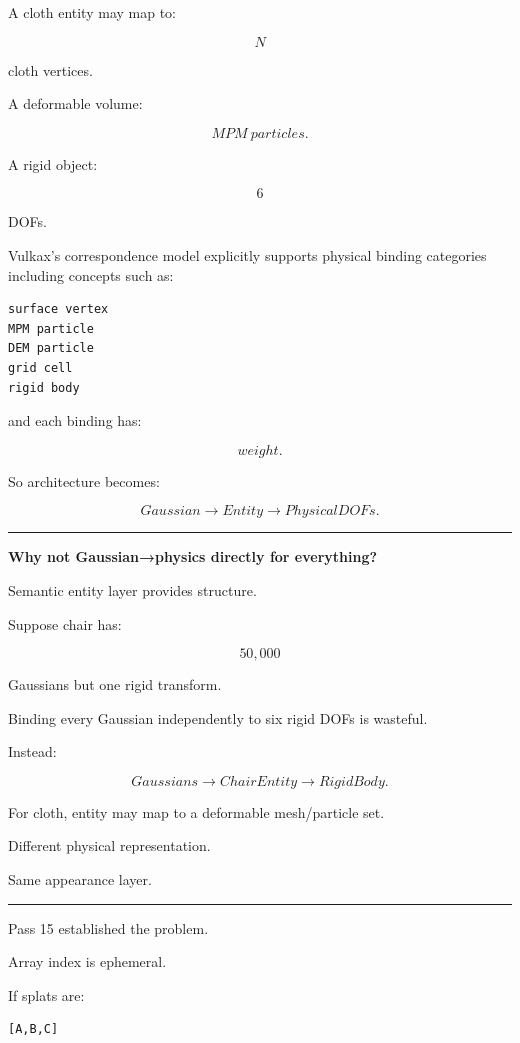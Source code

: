 A cloth entity may map to:

\[
N
\]

cloth vertices.

A deformable volume:

\[
MPM\ particles.
\]

A rigid object:

\[
6
\]

DOFs.

Vulkax's correspondence model explicitly supports physical binding categories including concepts such as:

\protect{}\label{ijumvh}%
\begin{verbatim}
surface vertex
MPM particle
DEM particle
grid cell
rigid body
\end{verbatim}

and each binding has:

\[
weight.
\]

So architecture becomes:

\[
Gaussian
\rightarrow
Entity
\rightarrow
PhysicalDOFs.
\]

\begin{center}\rule{0.5\linewidth}{0.5pt}\end{center}

\textbf{Why not Gaussian→physics directly for everything?}

Semantic entity layer provides structure.

Suppose chair has:

\[
50,000
\]

Gaussians but one rigid transform.

Binding every Gaussian independently to six rigid DOFs is wasteful.

Instead:

\[
Gaussians
\rightarrow
ChairEntity
\rightarrow
RigidBody.
\]

For cloth, entity may map to a deformable mesh/particle set.

Different physical representation.

Same appearance layer.

\begin{center}\rule{0.5\linewidth}{0.5pt}\end{center}

Pass 15 established the problem.

Array index is ephemeral.

If splats are:

\protect{}\label{f90y7n}%
\begin{verbatim}
[A,B,C]
\end{verbatim}

